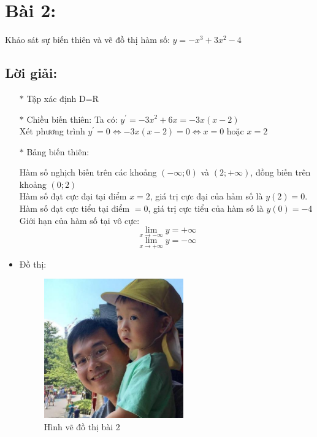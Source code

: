 \section*{Bài 2:}
Khảo sát sự biến thiên và vẽ đồ thị hàm số: $y = -x^3 + 3x^2 - 4$

\subsection*{Lời giải:}
\begin{itemize}
\item[$\ast$] Tập xác định D=R
\item[$\ast$] Chiều biến thiên:
Ta có: $y^{\prime} = -3x^2 + 6x = -3x(x-2)$ \\
Xét phương trình $y^{\prime} = 0 \Leftrightarrow -3x(x-2) = 0 \Leftrightarrow x = 0$ hoặc $x = 2$
\item[$\ast$] Bảng biến thiên:
	\begin{figure}[H]
		\centering
	\end{figure}
	Hàm số nghịch biến trên các khoảng $(-\infty; 0)$ và $(2; +\infty)$, đồng biến trên khoảng $(0; 2)$ \\
	Hàm số đạt cực đại tại điểm $x=2$, giá trị cực đại của hảm số là $y(2)=0$. \\
	Hàm số đạt cực tiểu tại điểm $=0$, giá trị cực tiểu của hàm số là $y(0)=-4$ \\
	Giới hạn của hàm số tại vô cực: 
	$$\lim_{x \to -\infty}{y} = +\infty$$
	$$\lim_{x \to +\infty}{y} = -\infty$$
\item Đồ thị:
	\begin{figure}[H]
		\centering
		\includegraphics[width=6cm]{images/cover/dhsp_logo.png}
		\caption{Hình vẽ đồ thị bài 2}
	\end{figure}
	
\end{itemize}

